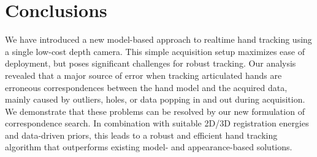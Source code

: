 






%
%

\section{Conclusions}


We have introduced a new model-based approach to realtime hand tracking using a single low-cost depth camera. This simple acquisition setup maximizes ease of deployment, but poses significant challenges for robust tracking.
%
Our analysis revealed that a major source of error when tracking articulated hands are erroneous correspondences between the hand model and the acquired data, mainly caused by outliers, holes, or data popping in and out during acquisition.
We demonstrate that these problems can be resolved by our new formulation of correspondence search. In combination with suitable 2D/3D registration energies and data-driven priors, this leads to a robust and efficient hand tracking algorithm that outperforms existing model- and appearance-based solutions.

